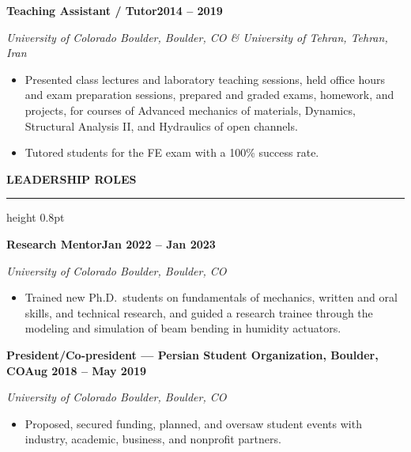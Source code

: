 \documentclass[10pt, letterpaper]{article}
\newcommand{\rsection}[1]{%
  \vspace{8pt}%
  {\large\bfseries\MakeUppercase{#1}}%
  \vspace{1pt}%
  \hrule height 0.8pt%
  \vspace{4pt}%
}
\newcommand{\jobline}[2]{%
  \vspace{5pt}%
  \noindent\textbf{#1}\hfill\textbf{#2}\par%
  \vspace{1pt}%
}
\newcommand{\subline}[1]{%
  \vspace{-1pt}%
  \noindent\textit{#1}\par%
  \vspace{1pt}%
}
\newenvironment{rlist}{%
  \begin{itemize}[leftmargin=1.4em, itemsep=1pt, topsep=2pt, parsep=0pt]%
}{%
  \end{itemize}%
}
\begin{document}
\jobline{Teaching Assistant / Tutor}{2014 -- 2019}
\subline{University of Colorado Boulder, Boulder, CO \& University of Tehran, Tehran, Iran}
\begin{rlist}
  \item Presented class lectures and laboratory teaching sessions, held office hours and exam preparation sessions, prepared and graded exams, homework, and projects, for courses of Advanced mechanics of materials, Dynamics, Structural Analysis II, and Hydraulics of open channels.
  \item Tutored students for the FE exam with a 100\% success rate.
\end{rlist}


\rsection{Leadership Roles}

\jobline{Research Mentor}{Jan 2022 -- Jan 2023}
\subline{University of Colorado Boulder, Boulder, CO}
\begin{rlist}
  \item Trained new Ph.D.\ students on fundamentals of mechanics, written and oral skills, and technical research, and guided a research trainee through the modeling and simulation of beam bending in humidity actuators.
\end{rlist}

\jobline{President/Co-president --- Persian Student Organization, Boulder, CO}{Aug 2018 -- May 2019}
\subline{University of Colorado Boulder, Boulder, CO}
\begin{rlist}
  \item Proposed, secured funding, planned, and oversaw student events with industry, academic, business, and nonprofit partners.
\end{rlist}
\end{document}
